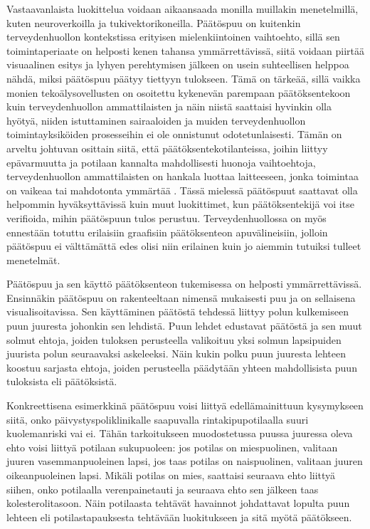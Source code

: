 \documentclass[12pt,finnish]{tktltiki2}
\theoremstyle{definition}
\theoremstyle{remark}
\begin{document}
Vastaavanlaista luokittelua voidaan aikaansaada monilla muillakin menetelmillä, kuten neuroverkoilla
ja tukivektorikoneilla. Päätöspuu on kuitenkin terveydenhuollon kontekstissa erityisen
mielenkiintoinen vaihtoehto, sillä sen toimintaperiaate on helposti kenen tahansa ymmärrettävissä,
siitä voidaan piirtää visuaalinen esitys ja lyhyen perehtymisen jälkeen on usein suhteellisen helppoa nähdä, miksi
päätöspuu päätyy tiettyyn tulokseen. Tämä on tärkeää, sillä vaikka monien tekoälysovellusten
on osoitettu kykenevän parempaan päätöksentekoon kuin terveydenhuollon ammattilaisten ja näin
niistä saattaisi hyvinkin olla hyötyä, niiden istuttaminen sairaaloiden ja muiden terveydenhuollon
toimintayksiköiden prosesseihin ei ole onnistunut odotetunlaisesti.
Tämän on arveltu johtuvan osittain siitä, että päätöksentekotilanteissa, joihin liittyy epävarmuutta
ja potilaan kannalta mahdollisesti huonoja vaihtoehtoja, terveydenhuollon ammattilaisten on hankala
luottaa laitteeseen, jonka toimintaa on vaikeaa tai mahdotonta ymmärtää \cite{comingOfAgeOfAIInMedicine}. 
Tässä mielessä päätöspuut saattavat olla helpommin
hyväksyttävissä kuin muut luokittimet, kun päätöksentekijä voi itse verifioida, mihin päätöspuun
tulos perustuu. Terveydenhuollossa on myös ennestään totuttu erilaisiin graafisiin päätöksenteon
apuvälineisiin, jolloin päätöspuu ei välttämättä edes olisi niin erilainen kuin jo aiemmin tutuiksi
tulleet menetelmät.
 
Päätöspuu ja sen käyttö päätöksenteon tukemisessa on helposti ymmärrettävissä. Ensinnäkin päätöspuu
on rakenteeltaan nimensä mukaisesti puu ja on sellaisena visualisoitavissa. Sen käyttäminen päätöstä
tehdessä liittyy polun kulkemiseen puun juuresta johonkin sen lehdistä. Puun lehdet edustavat päätöstä
ja sen muut solmut ehtoja, joiden tuloksen perusteella valikoituu yksi solmun lapsipuiden juurista
polun seuraavaksi askeleeksi. Näin kukin polku puun juuresta lehteen koostuu sarjasta ehtoja, joiden
perusteella päädytään yhteen mahdollisista puun tuloksista eli päätöksistä.

Konkreettisena esimerkkinä päätöspuu voisi liittyä edellämainittuun kysymykseen siitä, onko
päivystyspoliklinikalle saapuvalla rintakipupotilaalla suuri kuolemanriski vai ei. Tähän tarkoitukseen
muodostetussa puussa juuressa oleva ehto voisi liittyä potilaan sukupuoleen: jos potilas on miespuolinen,
valitaan juuren vasemmanpuoleinen lapsi, jos taas potilas on naispuolinen, valitaan
juuren oikeanpuoleinen lapsi. Mikäli potilas on mies, saattaisi seuraava ehto liittyä siihen,
onko potilaalla verenpainetauti ja seuraava ehto sen jälkeen taas kolesterolitasoon. Näin
potilaasta tehtävät havainnot johdattavat lopulta puun lehteen eli potilastapauksesta tehtävään
luokitukseen ja sitä myötä päätökseen.
\end{document}

